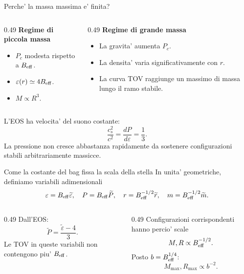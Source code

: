 \begin{frame}{Perche' la massa massima e' finita?}
\small
\begin{columns}[T,onlytextwidth]
\begin{column}{0.49\textwidth}
\textbf{Regime di piccola massa}
\begin{itemize}
\item $P_c$ modesta rispetto a $B_{\rm eff}$.
\item $\varepsilon(r)\simeq4B_{\rm eff}$.
\item $M\propto R^3$.
\end{itemize}
\end{column}
\begin{column}{0.49\textwidth}
\textbf{Regime di grande massa}
\begin{itemize}
\item La gravita' aumenta $P_c$.
\item La densita' varia significativamente con $r$.
\item La curva TOV raggiunge un massimo di massa lungo il ramo stabile.
\end{itemize}
\end{column}
\end{columns}
\medskip
L'EOS ha velocita' del suono costante:
\[
\frac{c_s^2}{c^2}=\frac{dP}{d\varepsilon}=\frac13.
\]
La pressione non cresce abbastanza rapidamente da sostenere configurazioni stabili arbitrariamente massicce.
\end{frame}

\begin{frame}{Come la costante del bag fissa la scala della stella}
\small
In unita' geometriche, definiamo variabili adimensionali
\[
\varepsilon=B_{\rm eff}\widetilde\varepsilon,
\quad P=B_{\rm eff}\widetilde P,
\quad r=B_{\rm eff}^{-1/2}\widetilde r,
\quad m=B_{\rm eff}^{-1/2}\widetilde m.
\]
\begin{columns}[T,onlytextwidth]
\begin{column}{0.49\textwidth}
Dall'EOS:
\[
\widetilde P=\frac{\widetilde\varepsilon-4}{3}.
\]
Le TOV in queste variabili non contengono piu' $B_{\rm eff}$.
\end{column}
\begin{column}{0.49\textwidth}
Configurazioni corrispondenti hanno percio' scale
\[
M,R\propto B_{\rm eff}^{-1/2}.
\]
Posto $b=B_{\rm eff}^{1/4}$:
\[
M_{\max},R_{\max}\propto b^{-2}.
\]
\end{column}
\end{columns}
\end{frame}

